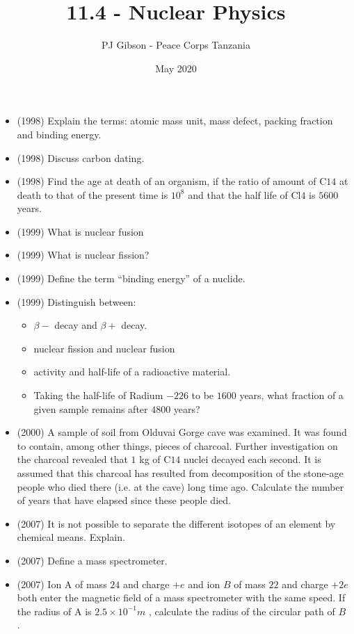 \documentclass{article}
\title{\textbf{11.4 - Nuclear Physics}}
\author{PJ Gibson - Peace Corps Tanzania}
\date{May 2020}
\begin{document}
\maketitle

\begin{itemize}
\item (1998)  Explain the terms: atomic mass unit, mass defect, packing fraction and binding energy.
\item (1998)  Discuss carbon dating.
\item (1998)  Find the age at death of an organism, if the ratio of amount of C$ 14$ at death to that of the present time is $ 10^{8}$ and that the half life of Cl$ 4$ is $ 5600$ years.
\item (1999)  What is nuclear fusion 
\item (1999)  What is nuclear fission?
\item (1999)  Define the term “binding energy” of a nuclide.
\item (1999)  Distinguish between:
 \begin{itemize}
\item $ \beta -$ decay and $ \beta +$ decay.
\item nuclear fission and nuclear fusion
\item activity and half-life of a radioactive material.
\item Taking the half-life of Radium $ -226$ to be $ 1600$ years, what fraction of a given sample remains after $ 4800$ years?
\end{itemize}
\item (2000)  A sample of soil from Olduvai Gorge cave was examined. It was found to contain, among other things, pieces of charcoal. Further investigation on the charcoal revealed that $ 1$ kg of C$ 14$ nuclei decayed each second. It is assumed that this charcoal has resulted from decomposition of the stone-age people who died there (i.e. at the cave) long time ago. Calculate the number of years that have elapsed since these people died.
\item (2007)  It is not possible to separate the different isotopes of an element by chemical means.  Explain.
\item (2007)  Define a mass spectrometer. 
\item (2007)  Ion A of mass $ 24$ and charge $ +e$ and ion $ B$ of mass $ 22$ and charge $ +2e$ both enter the magnetic field of a mass spectrometer with the same speed. If the radius of A is $ 2.5 \times 10^{-1}m$ , calculate the radius of the circular path of $ B$ . 

\end{itemize}
\end{document}
